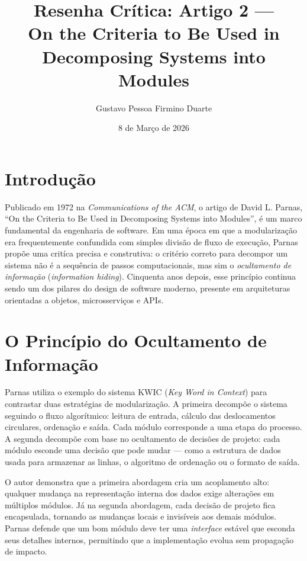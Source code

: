\documentclass[12pt,a4paper]{article}
\title{Resenha Cr\'itica: Artigo 2 ---\\
On the Criteria to Be Used in Decomposing Systems into Modules}
\author{Gustavo Pessoa Firmino Duarte}
\date{8 de Mar\c{c}o de 2026}
\begin{document}
\maketitle

\section{Introdu\c{c}\~ao}

Publicado em 1972 na \textit{Communications of the ACM}, o artigo de David L. Parnas,
``On the Criteria to Be Used in Decomposing Systems into Modules'', \'e um marco
fundamental da engenharia de software. Em uma \'epoca em que a modulariza\c{c}\~ao
era frequentemente confundida com simples divis\~ao de fluxo de execu\c{c}\~ao,
Parnas prop\~oe uma crit\'ica precisa e construtiva: o crit\'erio correto para
decompor um sistema n\~ao \'e a sequ\^encia de passos computacionais, mas sim o
\textit{ocultamento de informa\c{c}\~ao} (\textit{information hiding}). Cinquenta
anos depois, esse princ\'ipio continua sendo um dos pilares do design de software
moderno, presente em arquiteturas orientadas a objetos, microsservi\c{c}os e APIs.

\section{O Princ\'ipio do Ocultamento de Informa\c{c}\~ao}

Parnas utiliza o exemplo do sistema KWIC (\textit{Key Word in Context}) para
contrastar duas estrat\'egias de modulariza\c{c}\~ao. A primeira decomp\~oe o sistema
seguindo o fluxo algor\'itmico: leitura de entrada, c\'alculo das deslocamentos
circulares, ordena\c{c}\~ao e sa\'ida. Cada m\'odulo corresponde a uma etapa do
processo. A segunda decomp\~oe com base no ocultamento de decis\~oes de projeto:
cada m\'odulo esconde uma decis\~ao que pode mudar --- como a estrutura de dados
usada para armazenar as linhas, o algoritmo de ordena\c{c}\~ao ou o formato de
sa\'ida.

O autor demonstra que a primeira abordagem cria um acoplamento alto: qualquer
mudan\c{c}a na representa\c{c}\~ao interna dos dados exige altera\c{c}\~oes em
m\'ultiplos m\'odulos. J\'a na segunda abordagem, cada decis\~ao de projeto fica
encapsulada, tornando as mudan\c{c}as locais e invis\'iveis aos demais m\'odulos.
Parnas defende que um bom m\'odulo deve ter uma \textit{interface} est\'avel que
esconda seus detalhes internos, permitindo que a implementa\c{c}\~ao evolua sem
propaga\c{c}\~ao de impacto.
\end{document}
